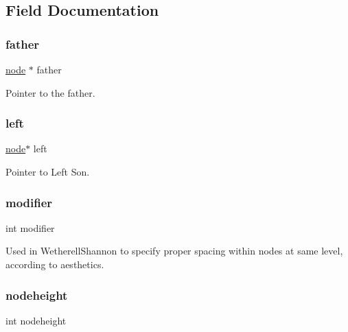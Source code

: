 \subsection{Field Documentation}
\hypertarget{structnodet_ad584b58b1159012e8a83c77d0365453a}{}\label{structnodet_ad584b58b1159012e8a83c77d0365453a} 
\subsubsection{\texorpdfstring{father}{father}}
{\footnotesize\ttfamily \hyperlink{binary_tree_w_s_8h_aafd781b4673cf2585cd9a156aebd08de}{node} $\ast$ father}



Pointer to the father. 

\hypertarget{structnodet_a1ef696d612a6d91ca233f86051a17560}{}\label{structnodet_a1ef696d612a6d91ca233f86051a17560} 
\subsubsection{\texorpdfstring{left}{left}}
{\footnotesize\ttfamily \hyperlink{binary_tree_w_s_8h_aafd781b4673cf2585cd9a156aebd08de}{node}$\ast$ left}



Pointer to Left Son. 

\hypertarget{structnodet_a75316f8e4ed23559b01079c4af92cb68}{}\label{structnodet_a75316f8e4ed23559b01079c4af92cb68} 
\subsubsection{\texorpdfstring{modifier}{modifier}}
{\footnotesize\ttfamily int modifier}



Used in Wetherell\+Shannon to specify proper spacing within nodes at same level, according to aesthetics. 

\hypertarget{structnodet_a815b222b610a0a4544e97062f1850836}{}\label{structnodet_a815b222b610a0a4544e97062f1850836} 
\subsubsection{\texorpdfstring{nodeheight}{nodeheight}}
{\footnotesize\ttfamily int nodeheight}



